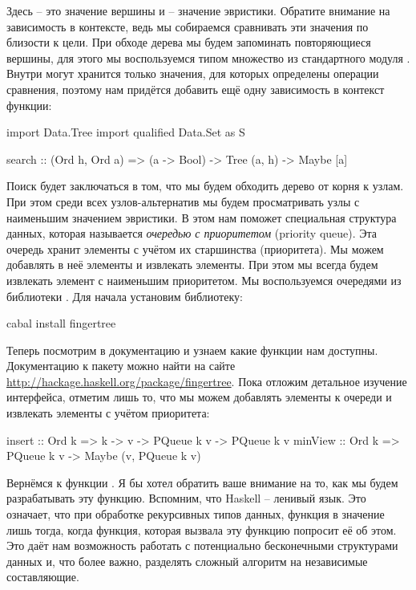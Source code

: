 Здесь  -- это значение вершины и  -- значение
эвристики. Обратите внимание на зависимость  в 
контексте, ведь мы собираемся сравнивать эти значения
по близости к цели. При обходе дерева мы будем запоминать
повторяющиеся вершины, для этого мы воспользуемся 
типом множество из стандартного модуля . 
Внутри  могут хранится только значения,
для которых определены операции сравнения, поэтому нам
придётся добавить ещё одну зависимость в контекст функции:

\begin{code}
import Data.Tree
import qualified Data.Set as S

search :: (Ord h, Ord a) => (a -> Bool) -> Tree (a, h) -> Maybe [a]
\end{code}

Поиск будет заключаться в том, что мы будем обходить
дерево от корня к узлам. При этом среди всех узлов-альтернатив
мы будем просматривать узлы с наименьшим значением эвристики.
В этом нам поможет специальная структура данных, которая называется 
\emph{очередью с приоритетом} (priority queue). 
Эта очередь хранит элементы с учётом их старшинства (приоритета).
Мы можем добавлять в неё элементы и извлекать элементы. 
При этом мы всегда будем извлекать элемент с наименьшим приоритетом.
Мы воспользуемся очередями из библиотеки . 
Для начала установим библиотеку:

\begin{code}
cabal install fingertree
\end{code}

Теперь посмотрим в документацию и узнаем какие функции нам доступны.
Документацию к пакету можно найти на сайте 
\url{http://hackage.haskell.org/package/fingertree}.
Пока отложим детальное изучение интерфейса, отметим
лишь то, что мы можем добавлять элементы к очереди
и извлекать элементы с учётом приоритета:

\begin{code}
insert  :: Ord k => k -> v -> PQueue k v -> PQueue k v
minView :: Ord k => PQueue k v -> Maybe (v, PQueue k v)
\end{code}

Вернёмся к функции . Я бы хотел обратить ваше внимание
на то, как мы будем разрабатывать эту функцию. 
Вспомним, что Haskell -- ленивый язык. Это означает, что
при обработке рекурсивных типов данных, функция 
в значение лишь тогда, когда функция, которая вызвала
эту функцию попросит её об этом. Это даёт нам возможность
работать с потенциально бесконечными структурами данных
и, что более важно, разделять сложный алгоритм на независимые
составляющие. 

